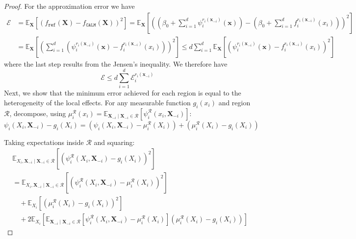 \begin{proof}
For the approximation error we have
\begin{align*}
\mathcal{E} &= \mathbb{E}_{\mathbf{X}}\left[\left(f_{\texttt{ref}}(\mathbf{X}) - f_{\texttt{CALM}}(\mathbf{X})\right)^2\right] = \mathbb{E}_{\mathbf{X}}\left[\left(\left(\beta_0+ \sum_{i = 1}^d\psi_i^{r_i(\mathbf{x}_{-i})}(\mathbf{x})\right) - \left(\beta_0 + \sum_{i=1}^{d}f_i^{r_i(\mathbf{x}_{-i})}(x_i)\right)\right)^2\right]\nonumber \\
&=\mathbb{E}_{\mathbf{X}}\left[\left(\sum_{i = 1}^d\left(\psi_i^{r_i(\mathbf{x}_{-i})}(\mathbf{x}) - f_i^{r_i(\mathbf{x}_{-i})}(x_i)\right)\right)^2\right]
\leq d\sum_{i=1} ^{d}\mathbb{E}_{\mathbf{X}}\left[\left(\psi_i^{r_i(\mathbf{x}_{-i})}(\mathbf{x}) - f_i^{r_i(\mathbf{x}_{-i})}(x_i)\right)^2\right]
\end{align*}
where the last step results from the Jensen's inequality. We therefore have
\begin{equation}
\mathcal{E} \leq d\sum_{i=1}^{d}\mathcal{E}^{r_i(\mathbf{x}_{-i})}_i
 \label{eq:error_approx}
\end{equation}
Next, we show that the minimum error achieved for each region is equal to the heterogeneity of the local effects. For any measurable function $g_i(x_i)$ and region $\mathcal{R}$, decompose, using $\mu^{\mathcal{R}}_i(x_i) = \mathbb{E}_{\mathbf{X}_{-i}\mid \mathbf{X}_{-i} \in \mathcal{R}}\left[\psi^{\mathcal{R}}_i(x_i, \mathbf{X}_{-i})\right]$:
\begin{equation*}
\psi_i(X_i, \mathbf{X}_{-i}) - g_i(X_i) = \left(\psi_i(X_i, \mathbf{X}_{-i}) - \mu^{\mathcal{R}}_i(X_i)\right) + \left(\mu^{\mathcal{R}}_i(X_i) - g_i(X_i)\right)
\end{equation*}

Taking expectations inside $\mathcal{R}$ and squaring:
\begin{align*}
&\mathbb{E}_{X_i, \mathbf{X}_{-i} \mid \mathbf{X}_{-i}\in \mathcal{R}}\left[\left(\psi_i^{\mathcal{R}}(X_i, \mathbf{X}_{-i}) - g_i(X_i)\right)^2\right] \\
&= \mathbb{E}_{X_i, \mathbf{X}_{-i} \mid \mathbf{X}_{-i}\in \mathcal{R}}\left[\left(\psi_i^{\mathcal{R}}(X_i, \mathbf{X}_{-i}) - \mu^{\mathcal{R}}_i(X_i)\right)^2\right] \\
&\quad + \mathbb{E}_{X_i}\left[\left(\mu^{\mathcal{R}}_i(X_i) - g_i(X_i)\right)^2\right] \\
&\quad + 2\mathbb{E}_{X_i}\left[\mathbb{E}_{\mathbf{X}_{-i}\mid \mathbf{X}_{-i} \in \mathcal{R}}\left[\psi_i^{\mathcal{R}}(X_i, \mathbf{X}_{-i}) - \mu^{\mathcal{R}}_i(X_i)\right]\left(\mu^{\mathcal{R}}_i(X_i) - g_i(X_i)\right)\right]
\end{align*}


\end{proof}
